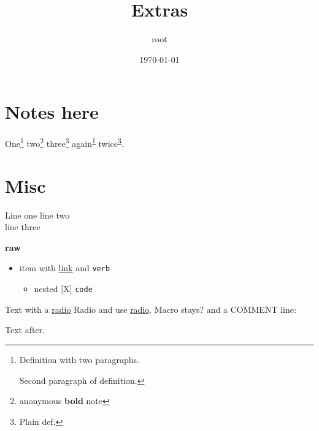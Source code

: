 \documentclass[11pt]{article}
\author{root}
\date{\today}
\title{Extras}
\begin{document}
\maketitle
\tableofcontents

\section{Notes here}
\label{sec:org6024e03}
One\footnote{Definition with two paragraphs.

Second paragraph of definition.\label{orgf90e91f}} two\footnote{anonymous \textbf{bold} note} three\footnote{Plain def.\label{org16e1dc4}} again\textsuperscript{\ref{orgf90e91f}} twice\textsuperscript{\ref{org16e1dc4}}.
\section{Misc}
\label{sec:orgac821d9}
Line one
line two \\[0pt]
line three

\textbf{raw}

\begin{itemize}
\item item with \href{https://x.org}{link} and \texttt{verb}
\begin{itemize}
\item nested [X] \texttt{code}
\end{itemize}
\end{itemize}

Text with a \hyperref[org7caf573]{radio} \label{org7caf573}Radio and use \hyperref[org7caf573]{radio}.
Macro  stays? and a COMMENT line:

Text after.
\end{document}
